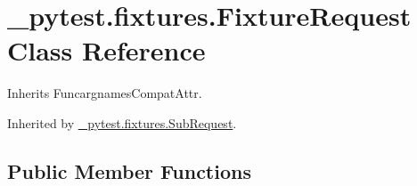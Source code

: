 \hypertarget{class__pytest_1_1fixtures_1_1_fixture_request}{}\section{\+\_\+pytest.\+fixtures.\+Fixture\+Request Class Reference}
\label{class__pytest_1_1fixtures_1_1_fixture_request}


Inherits Funcargnames\+Compat\+Attr.



Inherited by \hyperlink{class__pytest_1_1fixtures_1_1_sub_request}{\+\_\+pytest.\+fixtures.\+Sub\+Request}.

\subsection*{Public Member Functions}
